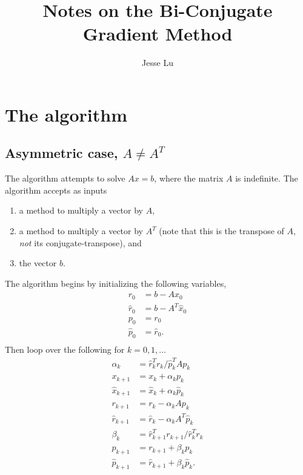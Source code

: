 \documentclass{article}
\title{Notes on the Bi-Conjugate Gradient Method}
\author{Jesse Lu}
\begin{document}
\maketitle
\tableofcontents
\section{The algorithm}
\subsection{Asymmetric case, $A \ne A^T$}
The algorithm attempts to solve $Ax = b$,
    where the matrix $A$ is indefinite.
The algorithm accepts as inputs
    \begin{enumerate}
    \item a method to multiply a vector by $A$,
    \item a method to multiply a vector by $A^T$ 
        (note that this is the transpose of $A$, 
        \emph{not} its conjugate-transpose), and
    \item the vector $b$.
    \end{enumerate}

The algorithm begins by initializing the following variables,
    \begin{subequations}\begin{align}
    r_0 &= b - Ax_0 \\
    \hat{r}_0 &= b - A^T \hat{x}_0 \\
    p_0 &= r_0 \\
    \hat{p}_0 &= \hat{r}_0.
    \end{align}\end{subequations}
    \begin{subequations}\begin{align}
    \end{align}\end{subequations}
Then loop over the following for $k = 0, 1, \ldots$
    \begin{subequations}\begin{align}
    \alpha_k &= \hat{r}_k^T r_k / \hat{p}_k^T A p_k \\
    x_{k+1} &= x_k + \alpha_k p_k \\
    \hat{x}_{k+1} &= \hat{x}_k + {\alpha_k} \hat{p}_k \\
    r_{k+1} &= r_k - \alpha_k A p_k \\
    \hat{r}_{k+1} &= \hat{r}_k - {\alpha_k} A^T \hat{p}_k \\
    \beta_k &= \hat{r}_{k+1}^T r_{k+1} / \hat{r}_k^T r_k \\
    p_{k+1} &= r_{k+1} + \beta_k p_k \\
    \hat{p}_{k+1} &= \hat{r}_{k+1} + {\beta_k} \hat{p}_k.
    \end{align}\end{subequations}
\end{document}
